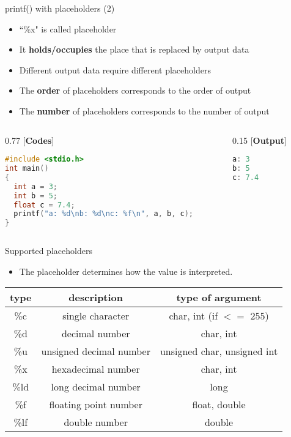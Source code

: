 \begin{frame}[fragile]{printf() with placeholders (2)}
	\begin{itemize}
		\item {``\%x" is called placeholder}
		\item {It \textbf{holds/occupies} the place that is replaced by output data}
		\item {Different output data require different placeholders}
		\item {The \textbf{order} of placeholders corresponds to the order of output}
		\item {The \textbf{number} of placeholders corresponds to the number of output}
	\end{itemize}
\begin{columns}	
\begin{column}{0.77\linewidth}
    [\textbf{Codes}]
	\begin{lstlisting}[numbers=none, language=c]
#include <stdio.h>
int main()
{
  int a = 3;
  int b = 5;
  float c = 7.4;
  printf("a: %d\nb: %d\nc: %f\n", a, b, c);
}
	\end{lstlisting}
\end{column}
\begin{column}{0.15\linewidth}
[\textbf{Output}]
\begin{lstlisting}[numbers=none, language=c]
a: 3
b: 5
c: 7.4
\end{lstlisting}
\end{column}
\end{columns}
\end{frame}

\begin{frame}{Supported placeholders}
\begin{itemize}
	\item {The placeholder determines how the value is interpreted.}
\end{itemize}
	\begin{tabular}{|c|c|c|}
		\hline
		\textbf{type} & \textbf{description} & \textbf{type of argument} \\\hline
		\%c & single character & char, int (if $<=$ 255) \\\hline
		\%d & decimal number & char, int \\\hline
		\%u & unsigned decimal number & unsigned char, unsigned int \\\hline
		\%x & hexadecimal number & char, int \\\hline
		\%ld & long decimal number & long \\\hline
		\%f & floating point number & float, double \\\hline
		\%lf & double number & double \\\hline
	\end{tabular}
\end{frame}

